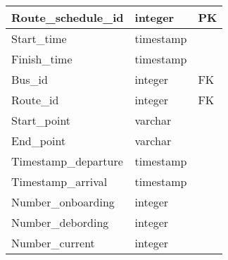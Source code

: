 \begin{table}[H]
	\centering
	\begin{tabular}{| m{4cm} | m{4cm} | m{4cm} |}
		\hline
		Route\_schedule\_id & integer & PK \\
		\hline
		Start\_time & timestamp & \\
		\hline
		Finish\_time & timestamp & \\
		\hline
		Bus\_id & integer & FK \\
		\hline
		Route\_id & integer & FK \\
		\hline
		Start\_point & varchar & \\
		\hline
		End\_point & varchar & \\
		\hline
		Timestamp\_departure & timestamp & \\
		\hline
		Timestamp\_arrival & timestamp & \\
		\hline
		Number\_onboarding & integer & \\
		\hline
		Number\_debording & integer & \\
		\hline
		Number\_current & integer & \\
		\hline
	\end{tabular}
\end{table}